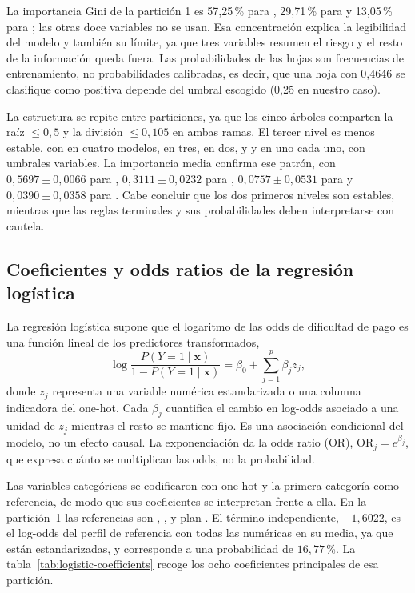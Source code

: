 La importancia Gini de la partición 1 es 57,25\,\% para , 29,71\,\% para  y 13,05\,\% para ; las otras doce variables no se usan. Esa concentración explica la legibilidad del modelo y también su límite, ya que tres variables resumen el riesgo y el resto de la información queda fuera. Las probabilidades de las hojas son frecuencias de entrenamiento, no probabilidades calibradas, es decir, que una hoja con 0,4646 se clasifique como positiva depende del umbral escogido (0,25 en nuestro caso).

La estructura se repite entre particiones, ya que los cinco árboles comparten la raíz  $\le 0{,}5$ y la división  $\le 0{,}105$ en ambas ramas. El tercer nivel es menos estable, con  en cuatro modelos,  en tres,  en dos, y  y  en uno cada uno, con umbrales variables. La importancia media confirma ese patrón, con $0{,}5697 \pm 0{,}0066$ para , $0{,}3111 \pm 0{,}0232$ para , $0{,}0757 \pm 0{,}0531$ para  y $0{,}0390 \pm 0{,}0358$ para . Cabe concluir que los dos primeros niveles son estables, mientras que las reglas terminales y sus probabilidades deben interpretarse con cautela.

\subsection{Coeficientes y odds ratios de la regresión logística}

La regresión logística supone que el logaritmo de las odds de dificultad de pago es una función lineal de los predictores transformados,
\[
\log\frac{P(Y=1\mid \mathbf{x})}{1-P(Y=1\mid \mathbf{x})}
= \beta_0 + \sum_{j=1}^{p}\beta_j z_j,
\]
donde $z_j$ representa una variable numérica estandarizada o una columna indicadora del one-hot. Cada $\beta_j$ cuantifica el cambio en log-odds asociado a una unidad de $z_j$ mientras el resto se mantiene fijo. Es una asociación condicional del modelo, no un efecto causal. La exponenciación da la odds ratio (OR), $\mathrm{OR}_j=e^{\beta_j}$, que expresa cuánto se multiplican las odds, no la probabilidad.

Las variables categóricas se codificaron con one-hot y la primera categoría como referencia, de modo que sus coeficientes se interpretan frente a ella. En la partición~1 las referencias son , ,  y plan . El término independiente, $-1{,}6022$, es el log-odds del perfil de referencia con todas las numéricas en su media, ya que están estandarizadas, y corresponde a una probabilidad de $16{,}77$\,\%. La tabla~\ref{tab:logistic-coefficients} recoge los ocho coeficientes principales de esa partición.

